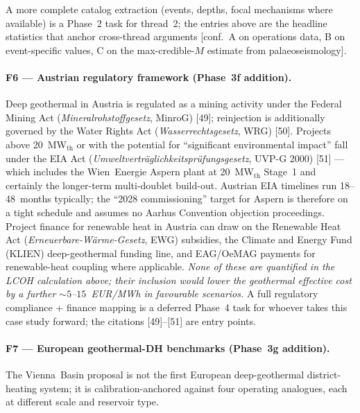 \documentclass{article}
\begin{document}
A more complete catalog extraction (events, depths, focal mechanisms
where available) is a Phase~2 task for thread~2; the entries above
are the headline statistics that anchor cross-thread arguments
[conf.\ A on operations data, B on event-specific values, C on the
max-credible-$M$ estimate from palaeoseismology].

\paragraph{F6 --- Austrian regulatory framework (Phase~3f addition).}
Deep geothermal in Austria is regulated as a mining activity under the
Federal Mining Act (\emph{Mineralrohstoffgesetz}, MinroG) [49];
reinjection is additionally governed by the Water Rights Act
(\emph{Wasserrechtsgesetz}, WRG) [50]. Projects above 20~MW$_{\mathrm{th}}$
or with the potential for ``significant environmental impact'' fall
under the EIA Act (\emph{Umweltvertr\"aglichkeitspr\"ufungsgesetz},
UVP-G 2000) [51] --- which includes the Wien~Energie Aspern plant at
20~MW$_{\mathrm{th}}$ Stage~1 and certainly the longer-term
multi-doublet build-out. Austrian EIA timelines run 18--48~months
typically; the ``2028 commissioning'' target for Aspern is therefore
on a tight schedule and assumes no Aarhus Convention objection
proceedings. Project finance for renewable heat in Austria can draw
on the Renewable Heat Act (\emph{Erneuerbare-W\"arme-Gesetz}, EWG)
subsidies, the Climate and Energy Fund (KLIEN) deep-geothermal
funding line, and EAG/OeMAG payments for renewable-heat coupling
where applicable. \emph{None of these are quantified in the
LCOH calculation above; their inclusion would lower the
geothermal effective cost by a further $\sim 5$--$15$~EUR/MWh in
favourable scenarios.} A full regulatory compliance + finance
mapping is a deferred Phase~4 task for whoever takes this case
study forward; the citations [49]--[51] are entry points.

\paragraph{F7 --- European geothermal-DH benchmarks (Phase~3g addition).}
The Vienna~Basin proposal is not the first European deep-geothermal
district-heating system; it is calibration-anchored against four
operating analogues, each at different scale and reservoir type.
\end{document}
